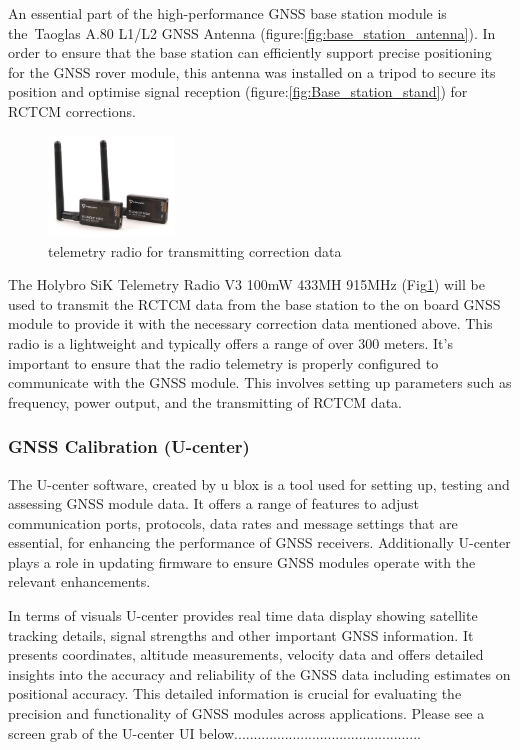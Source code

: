 \documentclass{article}
\begin{document}
An essential part of the high-performance GNSS base station module is
the Taoglas A.80 L1/L2 GNSS Antenna (figure:\ref{fig:base_station_antenna}). In
order to ensure that the base station can efficiently support precise
positioning for the GNSS rover module, this antenna was installed on a tripod to
secure its position and optimise signal reception
(figure:\ref{fig:Base_station_stand}) for RCTCM corrections. 

\begin{figure}[H]
  \centering
  \includegraphics[width=0.3\textwidth]{Pictures/telemetry radio.png}
  \caption{telemetry radio for transmitting correction data}
  \label{fig:telemetry_radio}
\end{figure}
The Holybro SiK Telemetry Radio V3 100mW 433MH 915MHz
(Fig\ref{fig:telemetry_radio}) will be used to transmit the RCTCM data from the
base station to the on board GNSS module to provide it with the necessary
correction data mentioned above. This radio is a lightweight and typically
offers a range of over 300 meters. It's important to ensure that the radio
telemetry is properly configured to communicate with the GNSS module. This
involves setting up parameters such as frequency, power output, and the
transmitting of RCTCM data.

\subsubsection{GNSS Calibration (U-center)}
The U-center software, created by u blox is a tool used for setting up, testing
and assessing GNSS module data. It offers a range of features to adjust
communication ports, protocols, data rates and message settings that are
essential, for enhancing the performance of GNSS receivers. Additionally
U-center plays a role in updating firmware to ensure GNSS modules operate with
the relevant enhancements.

In terms of visuals U-center provides real time data display showing satellite
tracking details, signal strengths and other important GNSS information. It
presents coordinates, altitude measurements, velocity data and offers detailed
insights into the accuracy and reliability of the GNSS data including estimates
on positional accuracy. This detailed information is crucial for evaluating the
precision and functionality of GNSS modules across applications. Please see a
screen grab of the U-center UI
below................................................
\end{document}
